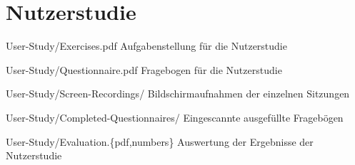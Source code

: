 \section{Nutzerstudie}
\label{sec:files-user-study}

\begin{fileslist}

\item[User-Study/Exercises.pdf] 
Aufgabenstellung für die Nutzerstudie

\item[User-Study/Questionnaire.pdf]
Fragebogen für die Nutzerstudie

\item[User-Study/Screen-Recordings/]
Bildschirmaufnahmen der einzelnen Sitzungen

\item[User-Study/Completed-Questionnaires/]
Eingescannte ausgefüllte Fragebögen

\item[User-Study/Evaluation.\{pdf,numbers\}]
Auswertung der Ergebnisse der Nutzerstudie

\end{fileslist}
